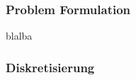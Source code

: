 

\begin{frame}
\frametitle{Problem Formulation}
blalba
\end{frame}


\begin{frame}
\frametitle{Diskretisierung}
\end{frame}